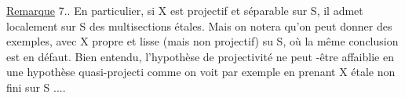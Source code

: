 \uline{Remarque} 7.. En particulier, si X est projectif et séparable sur S,
il admet localement sur S des multisections étales. Mais on notera qu'on
peut donner des exemples, avec X propre et lisse (mais non projectif) su
S, où la même conclusion est en défaut. Bien entendu, l'hypothèse de
 projectivité ne peut -être affaiblie  en une hypothèse quasi-projecti
comme on voit par exemple en prenant X étale non fini sur S ....



